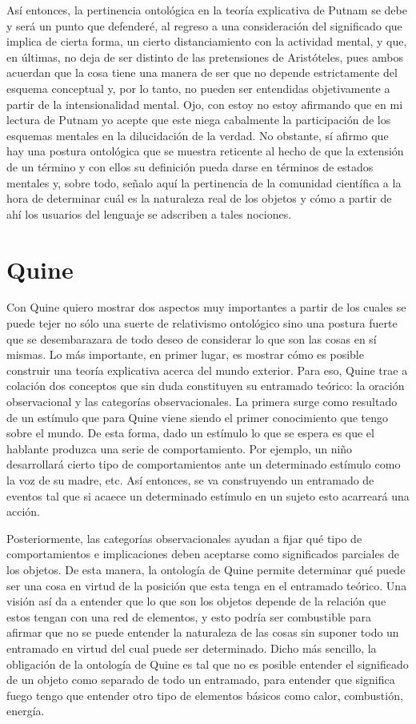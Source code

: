 \documentclass[]{book}
\begin{document}
Así entonces, la pertinencia ontológica en la teoría explicativa de
Putnam se debe y será un punto que defenderé, al regreso a una
consideración del significado que implica de cierta forma, un cierto
distanciamiento con la actividad mental, y que, en últimas, no deja de
ser distinto de las pretensiones de Aristóteles, pues ambos acuerdan que
la cosa tiene una manera de ser que no depende estrictamente del esquema
conceptual y, por lo tanto, no pueden ser entendidas objetivamente a
partir de la intensionalidad mental. Ojo, con estoy no estoy afirmando
que en mi lectura de Putnam yo acepte que este niega cabalmente la
participación de los esquemas mentales en la dilucidación de la verdad.
No obstante, sí afirmo que hay una postura ontológica que se muestra
reticente al hecho de que la extensión de un término y con ellos su
definición pueda darse en términos de estados mentales y, sobre todo,
señalo aquí la pertinencia de la comunidad científica a la hora de
determinar cuál es la naturaleza real de los objetos y cómo a partir de
ahí los usuarios del lenguaje se adscriben a tales nociones.

\section*{Quine}

Con Quine quiero mostrar dos aspectos muy importantes a partir de los
cuales se puede tejer no sólo una suerte de relativismo ontológico sino
una postura fuerte que se desembarazara de todo deseo de considerar lo
que son las cosas en sí mismas. Lo más importante, en primer lugar, es
mostrar cómo es posible construir una teoría explicativa acerca del
mundo exterior. Para eso, Quine trae a colación dos conceptos que sin
duda constituyen su entramado teórico: la oración observacional y las
categorías observacionales. La primera surge como resultado de un
estímulo que para Quine viene siendo el primer conocimiento que tengo
sobre el mundo. De esta forma, dado un estímulo lo que se espera es que
el hablante produzca una serie de comportamiento. Por ejemplo, un niño
desarrollará cierto tipo de comportamientos ante un determinado estímulo
como la voz de su madre, etc. Así entonces, se va construyendo un
entramado de eventos tal que si acaece un determinado estímulo en un
sujeto esto acarreará una acción.

Posteriormente, las categorías observacionales ayudan a fijar qué tipo
de comportamientos e implicaciones deben aceptarse como significados
parciales de los objetos. De esta manera, la ontología de Quine permite
determinar qué puede ser una cosa en virtud de la posición que esta
tenga en el entramado teórico. Una visión así da a entender que lo que
son los objetos depende de la relación que estos tengan con una red de
elementos, y esto podría ser combustible para afirmar que no se puede
entender la naturaleza de las cosas sin suponer todo un entramado en
virtud del cual puede ser determinado. Dicho más sencillo, la obligación
de la ontología de Quine es tal que no es posible entender el
significado de un objeto como separado de todo un entramado, para
entender que significa fuego tengo que entender otro tipo de elementos
básicos como calor, combustión, energía.
\end{document}
